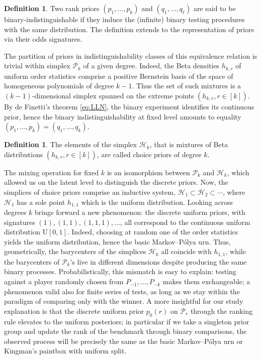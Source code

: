 \documentclass[11pt,reqno]{amsart}
\theoremstyle{definition}
\newtheorem{definition}[theorem]{Definition}
\theoremstyle{remark}
\numberwithin{equation}{section}
\begin{document}
\begin{definition}
Two rank priors \((p_1,\dots,p_k)\) and \((q_1,\dots,q_\ell)\) are said to be binary-indistinguishable if they induce the (infinite) binary testing procedures with the same distribution. The definition extends to the representation of priors via their odds signatures.
\end{definition}

The partition of priors in indistinguishability classes of this equivalence relation is trivial within simplex \(\mathcal{P}_k\) of a given degree. Indeed, the Beta densities \(h_{k,r}\) of uniform order statistics comprise a positive Bernstein basis of the space of homogeneous polynomials of degree \(k-1\). Thus the set of such mixtures is a \((k-1)\)-dimensional simplex spanned on the extreme points \((h_{k,r},r\in[k])\). By de Finetti's theorem \eqref{eq:LLN}, the binary experiment identifies its continuous prior, hence the binary indistinguishability at fixed level amounts to equality \((p_1,\dots,p_k)=(q_1,\dots,q_k)\).

\begin{definition}
The elements of the simplex \(\mathcal{H}_k\), that is mixtures of Beta distributions \((h_{k,r},r\in[k])\), are called choice priors of degree \(k\).
\end{definition}

The mixing operation for fixed \(k\) is an isomorphism between \(\mathcal{P}_k\) and \(\mathcal{H}_k\), which allowed us on the latent level to distinguish the discrete priors. Now, the simplices of choice priors comprise an inductive system, \(\mathcal{H}_1\subset\mathcal{H}_2\subset\cdots\), where \(\mathcal{H}_1\) has a sole point \(h_{1,1}\) which is the uniform distribution. Looking across degrees \(k\) brings forward a new phenomenon: the discrete uniform priors, with signatures \((1),(1,1),(1,1,1),\dots\), all correspond to the continuous uniform distribution \(\mathrm{U}[0,1]\). Indeed, choosing at random one of the order statistics yields the uniform distribution, hence the basic Markov--P\'olya urn. Thus, geometrically, the barycenters of the simplices \(\mathcal{H}_k\) all coincide with \(h_{1,1}\), while the barycenters of \(\mathcal{P}_k\)'s live in different dimensions despite producing the same binary processes. Probabilistically, this mismatch is easy to explain: testing against a player randomly chosen from \(P_{-1},\dots,P_{-k}\) makes them exchangeable; a phenomenon valid also for finite series of tests, as long as we stay within the paradigm of comparing only with the winner. A more insightful for our study explanation is that the discrete uniform prior \(p_0(r)\) on \(\mathcal{P}_r\) through the ranking rule elevates to the uniform posteriors; in particular if we take a singleton prior group and update the rank of the benchmark through binary comparisons, the observed process will be precisely the same as the basic Markov--P\'olya urn or Kingman's paintbox with uniform split.
\end{document}
